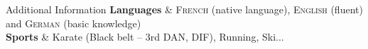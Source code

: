 %
%
%

\begin{rubriquetableau}[\offsetintab]{Additional Information}
    \textbf{Languages}
    & \textsc{French} (native language), \textsc{English}
    (fluent) and \textsc{German} (basic knowledge)
    \\
    \textbf{Sports}
    & Karate (Black belt -- {\small 3rd DAN}, \acf{DIF}), Running, Ski...
    \\
\end{rubriquetableau}

%
